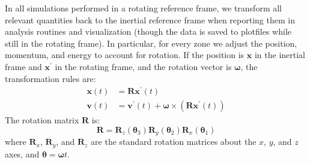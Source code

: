 \documentclass[iop,numberedappendix]{../emulateapj}
\begin{document}
In all simulations performed in a rotating reference frame, we transform all relevant
quantities back to the inertial reference frame when reporting them in analysis routines 
and visualization (though the data is saved to plotfiles while still in the rotating frame). In particular,
for every zone we adjust the position, momentum, and energy to account for rotation.
If the position is $\mathbf{x}$ in the inertial frame and $\mathbf{x}^\prime$ in 
the rotating frame, and the rotation vector is $\bm{\omega}$, the transformation rules are:
\begin{align}  
  \mathbf{x}(t) &= \mathbf{R}\mathbf{x}^\prime(t) \\
  \mathbf{v}(t) &= \mathbf{v}^\prime(t) + \bm{\omega} \times \left(\mathbf{R} \mathbf{x}^\prime(t)\right)
\end{align}
The rotation matrix $\mathbf{R}$ is:
\begin{equation}
  \mathbf{R} = \mathbf{R}_z({\bm{\theta}}_3) \mathbf{R}_y({\bm{\theta}}_2) \mathbf{R}_x({\bm{\theta}}_1) 
\end{equation}
where $\mathbf{R}_x$, $\mathbf{R}_y$, and $\mathbf{R}_z$ are the standard rotation matrices about 
the $x$, $y$, and $z$ axes, and $\bm{\theta} = \bm{\omega} t$.



\end{document}
